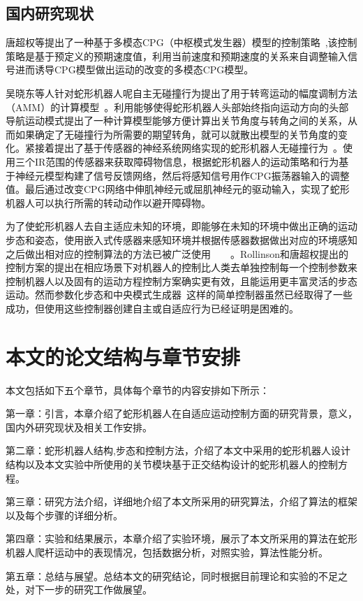 \subsection{国内研究现状}
唐超权等提出了一种基于多模态CPG（中枢模式发生器）模型的控制策略~\cite{CPGenabling},该控制策略是基于预定义的预期速度值，利用当前速度和预期速度的关系来自调整输入信号进而诱导CPG模型做出运动的改变的多模态CPG模型。

吴晓东等人针对蛇形机器人呢自主无碰撞行为提出了用于转弯运动的幅度调制方法（AMM）的计算模型~\cite{Wu2010Autonomous}。利用能够使得蛇形机器人头部始终指向运动方向的头部导航运动模式提出了一种计算模型能够方便计算出关节角度与转角之间的关系，从而如果确定了无碰撞行为所需要的期望转角，就可以就散出模型的关节角度的变化。紧接着提出了基于传感器的神经系统网络实现的蛇形机器人无碰撞行为~\cite{Wu2011Sensor}。使用三个IR范围的传感器来获取障碍物信息，根据蛇形机器人的运动策略和行为基于神经元模型构建了信号反馈网络，然后将感知信号用作CPG振荡器输入的调整值。最后通过改变CPG网络中伸肌神经元或屈肌神经元的驱动输入，实现了蛇形机器人可以执行所需的转动动作以避开障碍物。

为了使蛇形机器人去自主适应未知的环境，即能够在未知的环境中做出正确的运动步态和姿态，使用嵌入式传感器来感知环境并根据传感器数据做出对应的环境感知之后做出相对应的控制算法的方法已被广泛使用~\cite{BalancingAndControl}~\cite{FeedbackControlOfSoft}~\cite{CPGenabling}~\cite{GaitBasedCompliant}。Rollinson和唐超权提出的控制方案的提出在相应场景下对机器人的控制比人类去单独控制每一个控制参数来控制机器人以及固有的运动方程控制方案确实更有效，且能运用更丰富灵活的步态运动。然而参数化步态和中央模式生成器~\cite{ijspeert2008central}这样的简单控制器虽然已经取得了一些成功，但使用这些控制器创建自主或自适应行为已经证明是困难的。

\section{本文的论文结构与章节安排}

\label{sec:arrangement}
本文包括如下五个章节，具体每个章节的内容安排如下所示：

第一章：引言，本章介绍了蛇形机器人在自适应运动控制方面的研究背景，意义，国内外研究现状及相关工作安排。

第二章：蛇形机器人结构,步态和控制方法，介绍了本文中采用的蛇形机器人设计结构以及本文实验中所使用的关节模块基于正交结构设计的蛇形机器人的控制方程。

第三章：研究方法介绍，详细地介绍了本文所采用的研究算法，介绍了算法的框架以及每个步骤的详细分析。

第四章：实验和结果展示，本章介绍了实验环境，展示了本文所采用的算法在蛇形机器人爬杆运动中的表现情况，包括数据分析，对照实验，算法性能分析。

第五章：总结与展望。总结本文的研究结论，同时根据目前理论和实验的不足之处，对下一步的研究工作做展望。

